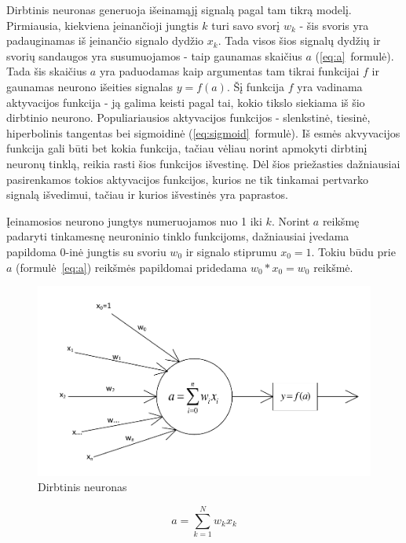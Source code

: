 \documentclass{VUMIFPSbakalaurinis}
\begin{document}
Dirbtinis neuronas generuoja išeinamąjį signalą pagal tam tikrą modelį.
Pirmiausia, kiekviena įeinančioji jungtis $k$ turi savo svorį $w_k$ - šis svoris yra padauginamas iš įeinančio signalo dydžio $x_k$.
Tada visos šios signalų dydžių ir svorių sandaugos yra susumuojamos - taip gaunamas skaičius $a$ (\ref{eq:a}~formulė).
Tada šis skaičius $a$ yra paduodamas kaip argumentas tam tikrai funkcijai $f$ ir gaunamas neurono išeities signalas $y = f(a)$.
Šį funkcija $f$ yra vadinama aktyvacijos funkcija - ją galima keisti pagal tai, kokio tikslo siekiama iš šio dirbtinio neurono.
Populiariausios aktyvacijos funkcijos - slenkstinė, tiesinė, hiperbolinis tangentas bei sigmoidinė (\ref{eq:sigmoid}~formulė).
Iš esmės akvyvacijos funkcija gali būti bet kokia funkcija, tačiau vėliau norint apmokyti dirbtinį neuronų tinklą, reikia rasti šios funkcijos išvestinę.
Dėl šios priežasties dažniausiai pasirenkamos tokios aktyvacijos funkcijos, kurios ne tik tinkamai pertvarko signalą išvedimui, tačiau ir kurios išvestinės yra paprastos.

Įeinamosios neurono jungtys numeruojamos nuo 1 iki $k$.
Norint $a$ reikšmę padaryti tinkamesnę neuroninio tinklo funkcijoms, dažniausiai įvedama papildoma $0$-inė jungtis su svoriu $w_0$ ir signalo stiprumu $x_0 = 1$.
Tokiu būdu prie $a$ (formulė~\ref{eq:a}) reikšmės papildomai pridedama $w_0 * x_0 = w_0$ reikšmė.



\begin{figure}
	\includegraphics[scale=0.75]{diagrams/1_neuron}
	\caption{Dirbtinis neuronas}
	\label{fig:neuron}
\end{figure}

\begin{equation} \label{eq:a}
a = \sum_{k=1}^N w_kx_k
\end{equation}
\end{document}

